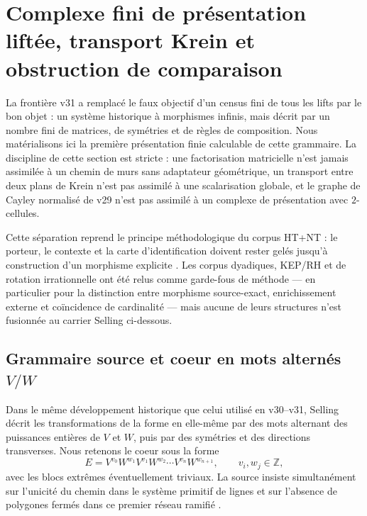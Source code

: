 \documentclass[11pt,a4paper]{article}
\begin{document}
\section{Complexe fini de présentation liftée, transport Krein et obstruction de comparaison}\label{sec:v32-presentation-transport-comparison}

La frontière v31 a remplacé le faux objectif d'un census fini de tous les lifts par le bon objet :
un système historique à morphismes infinis, mais décrit par un nombre fini de matrices, de
symétries et de règles de composition. Nous matérialisons ici la première présentation finie
calculable de cette grammaire. La discipline de cette section est stricte : une factorisation
matricielle n'est jamais assimilée à un chemin de murs sans adaptateur géométrique, un transport
entre deux plans de Krein n'est pas assimilé à une scalarisation globale, et le graphe de Cayley
normalisé de v29 n'est pas assimilé à un complexe de présentation avec $2$-cellules.

Cette séparation reprend le principe méthodologique du corpus HT+NT : le porteur, le contexte
et la carte d'identification doivent rester gelés jusqu'à construction d'un morphisme explicite
\cite{SellingHTNT,Reversal,Selling43}. Les corpus dyadiques, KEP/RH et de rotation irrationnelle
ont été relus comme garde-fous de méthode --- en particulier pour la distinction entre morphisme
source-exact, enrichissement externe et coïncidence de cardinalité --- mais aucune de leurs
structures n'est fusionnée au carrier Selling ci-dessous.

\subsection{Grammaire source et coeur en mots alternés $V/W$}

Dans le même développement historique que celui utilisé en v30--v31, Selling décrit les
transformations de la forme en elle-même par des mots alternant des puissances entières de $V$ et
$W$, puis par des symétries et des directions transverses. Nous retenons le coeur sous la forme
\begin{equation}\label{eq:v32-E-normal-form}
 E
 =V^{v_0}W^{w_1}V^{v_1}W^{w_2}\cdots V^{v_n}W^{w_{n+1}},
 \qquad v_i,w_j\in\mathbb Z,
\end{equation}
avec les blocs extrêmes éventuellement triviaux. La source insiste simultanément sur l'unicité du
chemin dans le système primitif de lignes et sur l'absence de polygones fermés dans ce premier
réseau ramifié \cite{Selling1877}.
\end{document}

